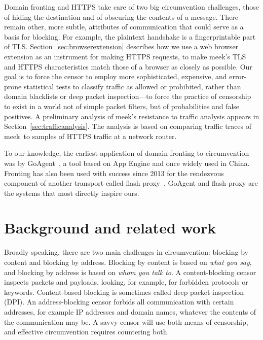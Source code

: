 \documentclass[conference]{IEEEtran}
\newcommand{\meek}{meek\xspace}
\begin{document}
Domain fronting and HTTPS take care of two big circumvention challenges,
those of hiding the destination and of obscuring the contents of a message.
There remain other, more subtle, attributes of communication
that could serve as a basis for blocking.
For example, the plaintext handshake is a fingerprintable part of TLS.
Section~\ref{sec:browserextension} describes how we use a web browser extension as an instrument for making HTTPS requests,
to make \meek's TLS and HTTPS characteristics
match those of a browser as closely as possible.
Our goal is to force the censor
to employ more sophisticated, expensive, and error-prone statistical tests
to classify traffic as allowed or prohibited,
rather than domain blacklists or deep packet inspection---to
force the practice of censorship to exist in a world
not of simple packet filters,
but of probabilities and false positives.
A preliminary analysis of \meek's resistance to traffic analysis
appears in Section~\ref{sec:trafficanalysis}.
The analysis is based on comparing traffic traces of \meek\
to samples of HTTPS traffic at a network router.

To our knowledge,
the earliest application of domain fronting to circumvention
was by GoAgent~\cite{goagent},
a tool based on App Engine and
once widely used in China.
Fronting has also been used with success since 2013
for the rendezvous component of another transport called flash proxy~\cite{flashproxy}.
GoAgent and flash proxy are the systems that most directly
inspire ours.


\section{Background and related work}
\label{sec:related-work}

Broadly speaking, there are two main challenges in circumvention:
blocking by content and blocking by address.
Blocking by content is based on \emph{what you say},
and blocking by address is based on \emph{whom you talk to}.
A content-blocking censor inspects packets and payloads,
looking, for example, for forbidden protocols or keywords.
Content-based blocking is sometimes called deep packet inspection (DPI).
An address-blocking censor forbids all communication with certain
addresses, for example IP addresses and domain names, whatever the contents of the communication may be.
A savvy censor will use both means of censorship, and
effective circumvention requires countering both.
\end{document}
